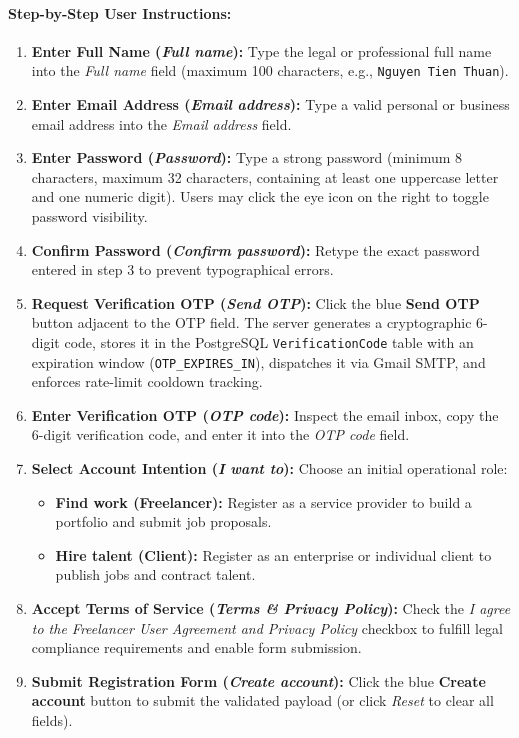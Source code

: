 \paragraph{Step-by-Step User Instructions:}
\begin{enumerate}[leftmargin=1.8em,itemsep=3pt]
  \item {} \textbf{Enter Full Name (\textit{Full name}):} Type the legal or professional full name into the \textit{Full name} field (maximum 100 characters, e.g., \texttt{Nguyen Tien Thuan}).
  \item {} \textbf{Enter Email Address (\textit{Email address}):} Type a valid personal or business email address into the \textit{Email address} field.
  \item {} \textbf{Enter Password (\textit{Password}):} Type a strong password (minimum 8 characters, maximum 32 characters, containing at least one uppercase letter and one numeric digit). Users may click the eye icon on the right to toggle password visibility.
  \item {} \textbf{Confirm Password (\textit{Confirm password}):} Retype the exact password entered in step 3 to prevent typographical errors.
  \item {} \textbf{Request Verification OTP (\textit{Send OTP}):} Click the blue \textbf{Send OTP} button adjacent to the OTP field. The server generates a cryptographic 6-digit code, stores it in the PostgreSQL \texttt{VerificationCode} table with an expiration window (\texttt{OTP\_EXPIRES\_IN}), dispatches it via Gmail SMTP, and enforces rate-limit cooldown tracking.
  \item {} \textbf{Enter Verification OTP (\textit{OTP code}):} Inspect the email inbox, copy the 6-digit verification code, and enter it into the \textit{OTP code} field.
  \item {} \textbf{Select Account Intention (\textit{I want to}):} Choose an initial operational role:
    \begin{itemize}
      \item \textbf{Find work (Freelancer):} Register as a service provider to build a portfolio and submit job proposals.
      \item \textbf{Hire talent (Client):} Register as an enterprise or individual client to publish jobs and contract talent.
    \end{itemize}
  \item {} \textbf{Accept Terms of Service (\textit{Terms \& Privacy Policy}):} Check the \textit{I agree to the Freelancer User Agreement and Privacy Policy} checkbox to fulfill legal compliance requirements and enable form submission.
  \item {} \textbf{Submit Registration Form (\textit{Create account}):} Click the blue \textbf{Create account} button to submit the validated payload (or click \textit{Reset} to clear all fields).
\end{enumerate}

